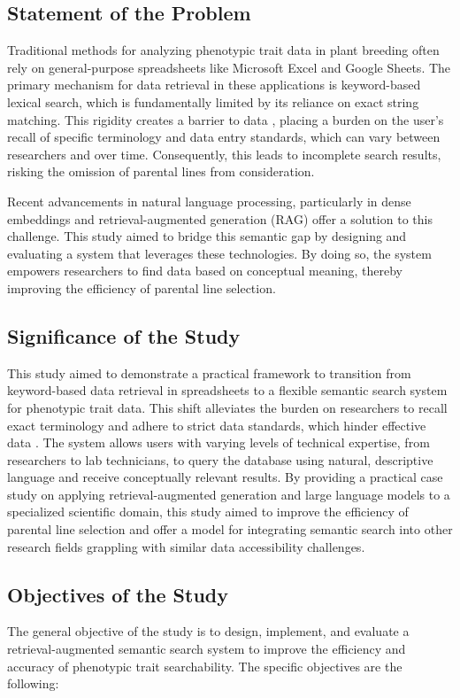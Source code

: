 \documentclass[journal]{./IEEE/IEEEtran}
\begin{document}
\subsection{Statement of the Problem}
Traditional methods for analyzing phenotypic trait data in plant breeding often rely on general-purpose spreadsheets like Microsoft Excel and Google Sheets. The primary mechanism for data retrieval in these applications is keyword-based lexical search, which is fundamentally limited by its reliance on exact string matching. This rigidity creates a barrier to data , placing a burden on the user's recall of specific terminology and data entry standards, which can vary between researchers and over time. Consequently, this leads to incomplete search results, risking the omission of parental lines from consideration.

Recent advancements in natural language processing, particularly in dense embeddings and retrieval-augmented generation (RAG) offer a solution to this challenge. This study aimed to bridge this semantic gap by designing and evaluating a system that leverages these technologies. By doing so, the system empowers researchers to find data based on conceptual meaning, thereby improving the efficiency of parental line selection.

\subsection{Significance of the Study}
This study aimed to demonstrate a practical framework to transition from keyword-based data retrieval in spreadsheets to a flexible semantic search system for phenotypic trait data. This shift alleviates the burden on researchers to recall exact terminology and adhere to strict data standards, which hinder effective data . The system allows users with varying levels of technical expertise, from researchers to lab technicians, to query the database using natural, descriptive language and receive conceptually relevant results. By providing a practical case study on applying retrieval-augmented generation and large language models to a specialized scientific domain, this study aimed to improve the efficiency of parental line selection and offer a model for integrating semantic search into other research fields grappling with similar data accessibility challenges.

\subsection{Objectives of the Study}
The general objective of the study is to design, implement, and evaluate a retrieval-augmented semantic search system to improve the efficiency and accuracy of phenotypic trait searchability. The specific objectives are the following:
\end{document}
